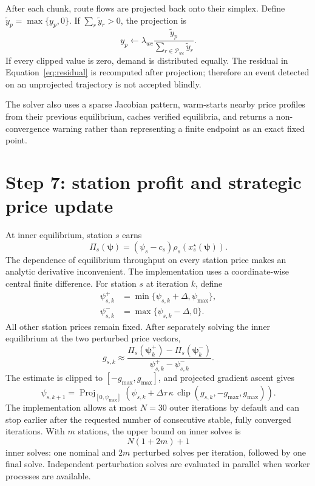 \documentclass[11pt]{article}
\newcommand{\clip}{\operatorname{clip}}
\newcommand{\proj}{\operatorname{Proj}}
\begin{document}
After each chunk, route flows are projected back onto their simplex. Define
$\widetilde y_p=\max\{y_p,0\}$. If
$\sum_r\widetilde y_r>0$, the projection is
\begin{equation}
    y_p\leftarrow
    \lambda_{wc}\frac{\widetilde y_p}
    {\sum_{r\in\mathcal P_{wc}}\widetilde y_r}.
    \label{eq:projection}
\end{equation}
If every clipped value is zero, demand is distributed equally. The residual
in Equation~\eqref{eq:residual} is recomputed after projection; therefore an
event detected on an unprojected trajectory is not accepted blindly.

The solver also uses a sparse Jacobian pattern, warm-starts nearby price
profiles from their previous equilibrium, caches verified equilibria, and
returns a non-convergence warning rather than representing a finite endpoint
as an exact fixed point.

\section{Step 7: station profit and strategic price update}

At inner equilibrium, station $s$ earns
\begin{equation}
    \Pi_s(\boldsymbol\psi)
    =(\psi_s-c_s)\rho_s
    \left(x_s^{\star}(\boldsymbol\psi)\right).
    \label{eq:profit}
\end{equation}
The dependence of equilibrium throughput on every station price makes an
analytic derivative inconvenient. The implementation uses a coordinate-wise
central finite difference. For station $s$ at iteration $k$, define
\begin{align}
    \psi_{s,k}^{+}&=\min\{\psi_{s,k}+\Delta,\psi_{\max}\},\\
    \psi_{s,k}^{-}&=\max\{\psi_{s,k}-\Delta,0\}.
\end{align}
All other station prices remain fixed. After separately solving the inner
equilibrium at the two perturbed price vectors,
\begin{equation}
    g_{s,k}
    \approx
    \frac{\Pi_s(\boldsymbol\psi_k^{+})
          -\Pi_s(\boldsymbol\psi_k^{-})}
         {\psi_{s,k}^{+}-\psi_{s,k}^{-}}.
    \label{eq:finite-difference}
\end{equation}
The estimate is clipped to $[-g_{\max},g_{\max}]$, and projected gradient
ascent gives
\begin{equation}
    \psi_{s,k+1}
    =\proj_{[0,\psi_{\max}]}
      \left(\psi_{s,k}+\Delta\tau\,\kappa\,
      \clip(g_{s,k},-g_{\max},g_{\max})\right).
    \label{eq:price-update}
\end{equation}
The implementation allows at most $N=30$ outer iterations by default and can
stop earlier after the requested number of consecutive stable, fully
converged iterations. With $m$ stations, the upper bound on inner solves is
\begin{equation}
    N(1+2m)+1
\end{equation}
inner solves: one nominal and $2m$ perturbed solves per iteration, followed by
one final solve. Independent perturbation solves are evaluated in parallel
when worker processes are available.
\end{document}
